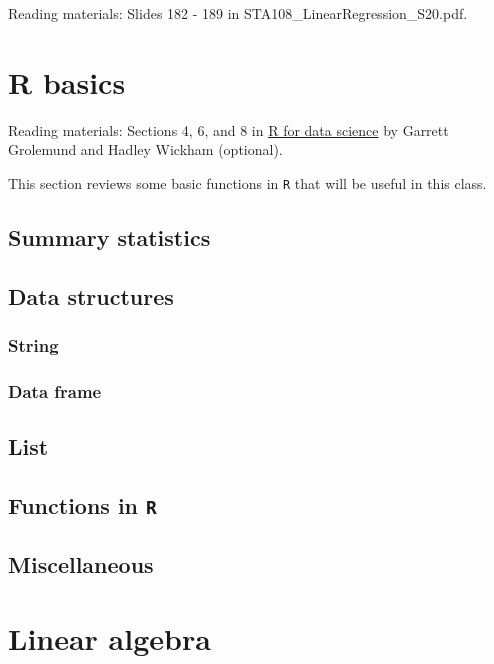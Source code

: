 \documentclass[12pt,]{book}
\begin{document}
Reading materials: Slides 182 - 189 in
STA108\_LinearRegression\_S20.pdf.

\appendix


\chapter{R basics}\label{ch:RBasics}

Reading materials: Sections 4, 6, and 8 in
\href{https://r4ds.had.co.nz/index.html}{R for data science} by Garrett
Grolemund and Hadley Wickham (optional).

This section reviews some basic functions in \texttt{R} that will be
useful in this class.

\section{Summary statistics}\label{summary-statistics}

\section{Data structures}\label{data-structures}

\subsection{String}\label{string}

\subsection{Data frame}\label{data-frame}

\section{List}\label{list}

\section{\texorpdfstring{Functions in
\texttt{R}}{Functions in R}}\label{functions-in-r}

\section{Miscellaneous}\label{miscellaneous}

\chapter{Linear algebra}\label{ch:algebra}
\end{document}
